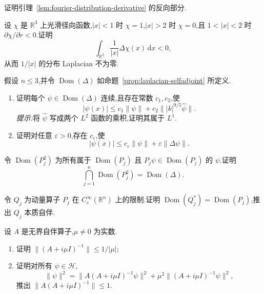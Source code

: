 \begin{exercise}[分布导数的反向命题]\label{ex:distributional-derivative-converse}
证明引理~\ref{lem:fourier-distribution-derivative} 的反向部分.
\end{exercise}

\begin{exercise}\label{ex:coulomb-laplacian-distribution}
设 \(\chi\) 是 \(\mathbb{R}^{3}\) 上光滑径向函数,\(|x|<1\) 时 \(\chi=1\),\(|x|>2\) 时 \(\chi=0\),且 \(1<|x|<2\) 时 \(\partial\chi/\partial r<0\).证明
\[
\int_{\mathbb{R}^{3}}\frac{1}{|x|}\Delta\chi(x)\,\mathrm{d}x<0,
\]
从而 \(1/|x|\) 的分布 Laplacian 不为零.
\end{exercise}

\begin{exercise}\label{ex:laplacian-continuity}
假设 \(n\leq3\),并令 \(\operatorname{Dom}(\Delta)\) 如命题~\ref{prop:laplacian-selfadjoint} 所定义.
\begin{enumerate}[label=(\alph*)]
\item 证明每个 \(\psi\in\operatorname{Dom}(\Delta)\) 连续,且存在常数 \(c_{1},c_{2}\),使
\[
|\psi(x)|\leq c_{1}\|\psi\|+c_{2}\||k|^{9/5}\widehat\psi\|.
\]
\emph{提示:}将 \(\widehat\psi\) 写成两个 \(L^{2}\) 函数的乘积,证明其属于 \(L^{1}\).
\item 证明对任意 \(\varepsilon>0\),存在 \(c_{\varepsilon}\),使
\[
|\psi(x)|\leq c_{\varepsilon}\|\psi\|+\varepsilon\|\Delta\psi\|.
\]
\end{enumerate}
\end{exercise}

\begin{exercise}\label{ex:momentum-square-domain}
令 \(\operatorname{Dom}(P_{j}^{2})\) 为所有属于 \(\operatorname{Dom}(P_{j})\) 且 \(P_{j}\psi\in\operatorname{Dom}(P_{j})\) 的 \(\psi\).证明
\[
\bigcap_{j=1}^{n}\operatorname{Dom}(P_{j}^{2})=\operatorname{Dom}(\Delta).
\]
\end{exercise}

\begin{exercise}[紧支集动量算子的本质自伴性]\label{ex:compact-momentum-adjoint-domain}
令 \(Q_{j}\) 为动量算子 \(P_{j}\) 在 \(C_{c}^{\infty}(\mathbb{R}^{n})\) 上的限制.证明 \(\operatorname{Dom}(Q_{j}^{*})=\operatorname{Dom}(P_{j})\),推出 \(Q_{j}\) 本质自伴.
\end{exercise}

\begin{exercise}[无界预解算子估计]\label{ex:unbounded-resolvent-estimates}
设 \(A\) 是无界自伴算子,\(\mu\neq0\) 为实数.
\begin{enumerate}[label=(\alph*)]
\item 证明 \(\|(A+i\mu I)^{-1}\|\leq1/|\mu|\);
\item 证明对所有 \(\psi\in\mathcal{H}\),
\[
\|\psi\|^{2}=\|A(A+i\mu I)^{-1}\psi\|^{2}+\mu^{2}\|(A+i\mu I)^{-1}\psi\|^{2},
\]
推出 \(\|A(A+i\mu I)^{-1}\|\leq1\).
\end{enumerate}
\end{exercise}

